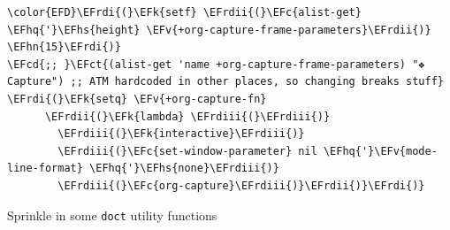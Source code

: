 \documentclass{scrartcl}
\newcommand{\EFk}[1]{\textcolor{EFk}{#1}} %
\newcommand{\EFct}[1]{\textcolor{EFct}{#1}} %
\newcommand{\EFc}[1]{\textcolor{EFc}{#1}} %
\newcommand{\EFv}[1]{\textcolor{EFv}{#1}} %
\newcommand{\EFcd}[1]{\textcolor{EFcd}{#1}} %
\newcommand{\EFhn}[1]{#1} %
\newcommand{\EFhq}[1]{#1} %
\newcommand{\EFhs}[1]{#1} %
\newcommand{\EFrdi}[1]{#1} %
\newcommand{\EFrdii}[1]{#1} %
\newcommand{\EFrdiii}[1]{#1} %
\begin{document}
\begin{Code}
\begin{Verbatim}[]
\color{EFD}\EFrdi{(}\EFk{setf} \EFrdii{(}\EFc{alist-get} \EFhq{'}\EFhs{height} \EFv{+org-capture-frame-parameters}\EFrdii{)} \EFhn{15}\EFrdi{)}
\EFcd{;; }\EFct{(alist-get 'name +org-capture-frame-parameters) "❖ Capture") ;; ATM hardcoded in other places, so changing breaks stuff}
\EFrdi{(}\EFk{setq} \EFv{+org-capture-fn}
      \EFrdii{(}\EFk{lambda} \EFrdiii{(}\EFrdiii{)}
        \EFrdiii{(}\EFk{interactive}\EFrdiii{)}
        \EFrdiii{(}\EFc{set-window-parameter} nil \EFhq{'}\EFv{mode-line-format} \EFhq{'}\EFhs{none}\EFrdiii{)}
        \EFrdiii{(}\EFc{org-capture}\EFrdiii{)}\EFrdii{)}\EFrdi{)}
\end{Verbatim}
\end{Code}

Sprinkle in some \texttt{doct} utility functions
\end{document}
